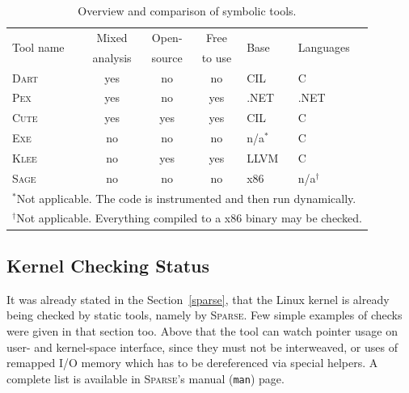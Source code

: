 \documentclass[11pt,a4paper]{article}
\begin{document}
\begin{table}[htb]
\begin{center}
\begin{tabular}{l|cccll}
\multirow{2}{*}{Tool name} &
Mixed &
Open- &
Free &
\multirow{2}{*}{Base} &
\multirow{2}{*}{Languages} \\
	      & analysis & source & to use &        & \\ \hline
\textsc{Dart} & yes      & no     & no   & CIL~\cite{cil} & C \\
\textsc{Pex}  & yes      & no     & yes  & .NET   & .NET \\
\textsc{Cute} & yes      & yes    & yes  & CIL    & C \\
\textsc{Exe}  & no       & no     & no   & n/a$^*$ & C \\
\textsc{Klee} & no       & yes    & yes  & LLVM   & C \\
\textsc{Sage} & no       & no     & no   & x86    & n/a$^\dagger$ \\
\hline
\multicolumn{6}{l}{\footnotesize $^*$Not applicable. The code is
instrumented and then run dynamically.} \\
\multicolumn{6}{l}{\footnotesize $^\dagger$Not applicable. Everything compiled
to a x86 binary may be checked.}
\end{tabular}
\caption{Overview and comparison of symbolic tools.}
\label{fig_se_comparison}
\end{center}
\end{table}

\subsection{Kernel Checking Status}
\label{sparse-detail}
It was already stated in the Section~\ref{sparse}, that the Linux kernel is
already being checked by static tools, namely by \textsc{Sparse}. Few simple
examples of checks were given in that section too. Above that the tool can
watch pointer usage on user- and kernel-space interface, since they must not
be interweaved, or uses of remapped I/O memory which has to be dereferenced
via special helpers. A complete list is available in \textsc{Sparse}'s manual
(\texttt{man}) page.
\end{document}
